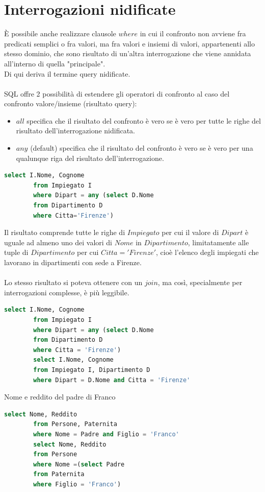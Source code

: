 \documentclass{article}
\begin{document}
	\section{Interrogazioni nidificate}
	È possibile anche realizzare clausole $where$ in cui il confronto non avviene fra predicati semplici o fra valori, ma fra valori e insiemi di valori, appartenenti allo stesso dominio, che sono risultato di un’altra interrogazione che viene annidata all'interno di quella "principale". \\
	Di qui deriva il termine query nidificate.\\\\
	SQL offre 2 possibilità di estendere gli operatori di confronto al caso del confronto valore/insieme (risultato query):
	\begin{itemize}
		\item $all$ specifica che il risultato del confronto è vero se è vero per tutte le righe del risultato dell’interrogazione nidificata.
		\item $any$ (default) specifica che il risultato del confronto è vero se è vero per una qualunque riga del risultato dell’interrogazione.
	\end{itemize}
	\begin{lstlisting}[language=SQL]
		select I.Nome, Cognome
		from Impiegato I
		where Dipart = any (select D.Nome
		from Dipartimento D
		where Citta='Firenze')
	\end{lstlisting}
	Il risultato comprende tutte le righe di $Impiegato$ per cui il valore di $Dipart$ è uguale ad almeno uno dei valori di $Nome$ in $Dipartimento$, limitatamente alle tuple di $Dipartimento$ per cui $Citta='Firenze'$, cioè l’elenco degli impiegati che lavorano in dipartimenti con sede a Firenze.\\\\
	Lo stesso risultato si poteva ottenere con un $join$, ma così, specialmente per interrogazioni complesse, è più leggibile.
	\begin{lstlisting}[language=SQL]
		select I.Nome, Cognome
		from Impiegato I
		where Dipart = any (select D.Nome
		from Dipartimento D
		where Citta = 'Firenze')
		select I.Nome, Cognome
		from Impiegato I, Dipartimento D
		where Dipart = D.Nome and Citta = 'Firenze'
	\end{lstlisting}
	Nome e reddito del padre di Franco
	\begin{lstlisting}[language=SQL]
		select Nome, Reddito
		from Persone, Paternita
		where Nome = Padre and Figlio = 'Franco'
		select Nome, Reddito
		from Persone
		where Nome =(select Padre
		from Paternita
		where Figlio = 'Franco')
	\end{lstlisting}
\end{document}
